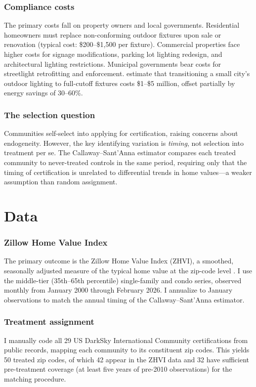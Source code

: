 \documentclass[12pt]{article}
\begin{document}
\subsubsection*{Compliance costs} The primary costs fall on property owners and local governments. Residential homeowners must replace non-conforming outdoor fixtures upon sale or renovation (typical cost: \$200--\$1{,}500 per fixture). Commercial properties face higher costs for signage modifications, parking lot lighting redesign, and architectural lighting restrictions. Municipal governments bear costs for streetlight retrofitting and enforcement. \citet{gallaway2010economics} estimate that transitioning a small city's outdoor lighting to full-cutoff fixtures costs \$1--\$5 million, offset partially by energy savings of 30--60\%.

\subsubsection*{The selection question} Communities self-select into applying for certification, raising concerns about endogeneity. However, the key identifying variation is \textit{timing}, not selection into treatment per se. The Callaway--Sant'Anna estimator compares each treated community to never-treated controls in the same period, requiring only that the timing of certification is unrelated to differential trends in home values---a weaker assumption than random assignment.

\section{Data}

\subsubsection*{Zillow Home Value Index} The primary outcome is the Zillow Home Value Index (ZHVI), a smoothed, seasonally adjusted measure of the typical home value at the zip-code level \citep{zillow2024methodology}. I use the middle-tier (35th--65th percentile) single-family and condo series, observed monthly from January 2000 through February 2026. I annualize to January observations to match the annual timing of the Callaway--Sant'Anna estimator.

\subsubsection*{Treatment assignment} I manually code all 29 US DarkSky International Community certifications from public records, mapping each community to its constituent zip codes. This yields 50 treated zip codes, of which 42 appear in the ZHVI data and 32 have sufficient pre-treatment coverage (at least five years of pre-2010 observations) for the matching procedure.
\end{document}

